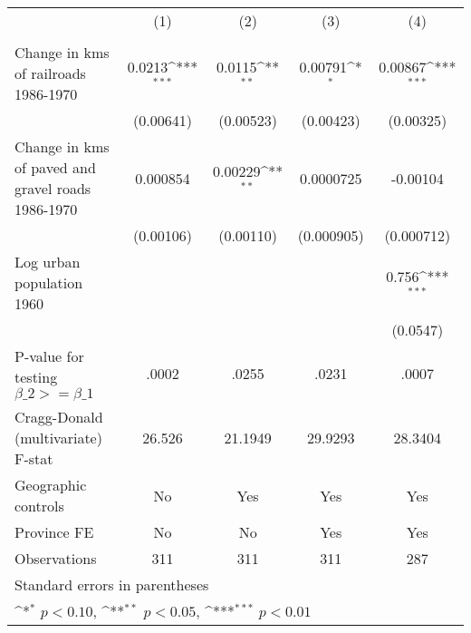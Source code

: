 {
\def\sym#1{\ifmmode^{#1}\else\(^{#1}\)\fi}
\begin{tabular}{l*{4}{c}}
\hline\hline
                &\multicolumn{1}{c}{(1)}&\multicolumn{1}{c}{(2)}&\multicolumn{1}{c}{(3)}&\multicolumn{1}{c}{(4)}\\
                &\multicolumn{1}{c}{}&\multicolumn{1}{c}{}&\multicolumn{1}{c}{}&\multicolumn{1}{c}{}\\
\hline
Change in kms of railroads 1986-1970&   0.0213\sym{***}&   0.0115\sym{**} &  0.00791\sym{*}  &  0.00867\sym{***}\\
                &(0.00641)         &(0.00523)         &(0.00423)         &(0.00325)         \\
[1em]
Change in kms of paved and gravel roads 1986-1970& 0.000854         &  0.00229\sym{**} &0.0000725         & -0.00104         \\
                &(0.00106)         &(0.00110)         &(0.000905)         &(0.000712)         \\
[1em]
Log urban population 1960&                  &                  &                  &    0.756\sym{***}\\
                &                  &                  &                  & (0.0547)         \\
\hline
P-value for testing $\beta\_{2} >= \beta\_{1}$&    .0002         &    .0255         &    .0231         &    .0007         \\
Cragg-Donald (multivariate) F-stat&   26.526         &  21.1949         &  29.9293         &  28.3404         \\
Geographic controls&       No         &      Yes         &      Yes         &      Yes         \\
Province FE     &       No         &       No         &      Yes         &      Yes         \\
Observations    &      311         &      311         &      311         &      287         \\
\hline\hline
\multicolumn{5}{l}{\footnotesize Standard errors in parentheses}\\
\multicolumn{5}{l}{\footnotesize \sym{*} \(p<0.10\), \sym{**} \(p<0.05\), \sym{***} \(p<0.01\)}\\
\end{tabular}
}

